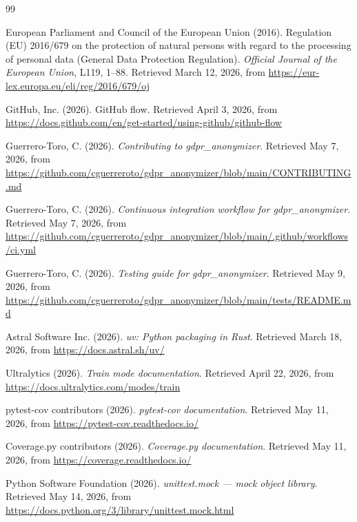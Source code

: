 
\begin{thebibliography}{99}

{\sc European Parliament and Council of the European Union}
(2016).
Regulation (EU) 2016/679 on the protection of natural persons with regard to the processing of personal data (General Data Protection Regulation).
\textit{Official Journal of the European Union}, L119, 1--88.
Retrieved March 12, 2026, from \url{https://eur-lex.europa.eu/eli/reg/2016/679/oj}

{\sc GitHub, Inc.}
(2026).
GitHub flow.
Retrieved April 3, 2026, from \url{https://docs.github.com/en/get-started/using-github/github-flow}

{\sc Guerrero-Toro, C.}
(2026).
\textit{Contributing to gdpr\_anonymizer}.
Retrieved May 7, 2026, from \url{https://github.com/cguerreroto/gdpr_anonymizer/blob/main/CONTRIBUTING.md}

{\sc Guerrero-Toro, C.}
(2026).
\textit{Continuous integration workflow for gdpr\_anonymizer}.
Retrieved May 7, 2026, from \url{https://github.com/cguerreroto/gdpr_anonymizer/blob/main/.github/workflows/ci.yml}

{\sc Guerrero-Toro, C.}
(2026).
\textit{Testing guide for gdpr\_anonymizer}.
Retrieved May 9, 2026, from \url{https://github.com/cguerreroto/gdpr_anonymizer/blob/main/tests/README.md}

{\sc Astral Software Inc.}
(2026).
\textit{uv: Python packaging in Rust}.
Retrieved March 18, 2026, from \url{https://docs.astral.sh/uv/}

{\sc Ultralytics}
(2026).
\textit{Train mode documentation}.
Retrieved April 22, 2026, from \url{https://docs.ultralytics.com/modes/train}

{\sc pytest-cov contributors}
(2026).
\textit{pytest-cov documentation}.
Retrieved May 11, 2026, from \url{https://pytest-cov.readthedocs.io/}

{\sc Coverage.py contributors}
(2026).
\textit{Coverage.py documentation}.
Retrieved May 11, 2026, from \url{https://coverage.readthedocs.io/}

{\sc Python Software Foundation}
(2026).
\textit{unittest.mock --- mock object library}.
Retrieved May 14, 2026, from \url{https://docs.python.org/3/library/unittest.mock.html}


\end{thebibliography}
